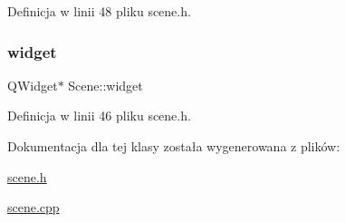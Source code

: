 Definicja w linii 48 pliku scene.\+h.

\mbox{\label{class_scene_aa6f9d0915a83b6d5e5083c439627ff06}} 
\subsubsection{\texorpdfstring{widget}{widget}}
{\footnotesize\ttfamily Q\+Widget$\ast$ Scene\+::widget}



Definicja w linii 46 pliku scene.\+h.



Dokumentacja dla tej klasy została wygenerowana z plików\+:\begin{DoxyCompactItemize}
\item 
\hyperlink{scene_8h}{scene.\+h}\item 
\hyperlink{scene_8cpp}{scene.\+cpp}\end{DoxyCompactItemize}

